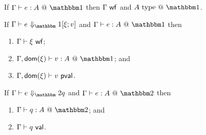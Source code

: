 \begin{theorem}
If $\typesone e A$ then $\Gamma\ \mathsf{wf}$ and $A\istypeone$.
\end{theorem}

\begin{theorem}
If $\diaonesub$ and $\typesone e A$ then
\begin{enumerate}
\item $\Gamma\vdash\xi\ \mathsf{wf}$;
\item $\Gamma,\dom\xi\vdash \colone{v}{A}$; and
\item $\Gamma,\mathsf{dom}(\xi)\vdash v\ \mathsf{pval}$.
\end{enumerate}
\end{theorem}

\begin{theorem}
If $\diatwosub$ and $\typestwo e A$ then
\begin{enumerate}
\item $\Gamma\vdash \coltwo{q}{A}$; and
\item $\Gamma\vdash q\ \mathsf{val}$.
\end{enumerate}
\end{theorem}



